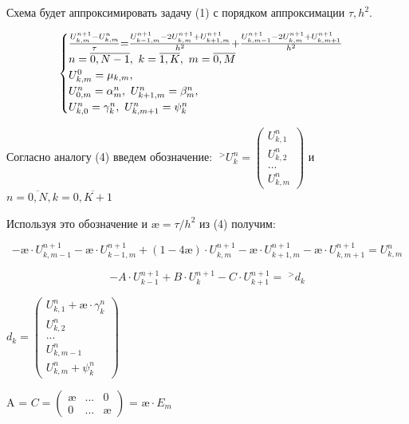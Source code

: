 \documentclass[__main__.tex]{subfiles}
\begin{document}
Схема будет аппроксимировать задачу (1) с порядком аппроксимации $ \tau, h^2 $.

\begin{equation} \label{50.4}
\begin{cases}
$$\frac{U^{n+1}_{k,m} - U^{n}_{k,m}}{\tau}$$ = $$\frac{U^{n+1}_{k-1,m} - 2U^{n+1}_{k,m} + U^{n+1}_{k+1,m}}{h^2}$$ + $$\frac{U^{n+1}_{k,m-1} - 2U^{n+1}_{k,m} + U^{n+1}_{k,m+1}}{h^2}$$ \\
n = \overline{0,N-1}, \ k = \overline{1,K}, \ m = \overline{0,M} \\
U^0_{k,m} = \mu_{k,m}, \\ 
U^n_{0,m} = \alpha^n_{m}, \ U^n_{k+1,m} = \beta^n_{m}, \\
U^n_{k,0} = \gamma^n_{k}, \ U^n_{k,m+1} = \psi^n_{k}
\end{cases}
\end{equation}

Согласно аналогу (4) введем обозначение: $\;^{>}U^n_k = \left(
\begin{matrix}
U^n_{k,1}  \\
U^n_{k,2}   \\
...  \\
U^n_{k,m}  
\end{matrix}
\right)$ и $n = \overline{0,N}, k = \overline{0,K+1}$

Используя это обозначение и $\text{\ae} = \tau/h^2$ из (4) получим:

\begin{equation}\label{50.5}
-\text{\ae} \cdot U^{n+1}_{k,m-1} - \text{\ae} \cdot U^{n+1}_{k-1,m} + (1 - 4\text{\ae}) \cdot U^{n+1}_{k,m} - \text{\ae} \cdot U^{n+1}_{k+1,m} - \text{\ae} \cdot U^{n+1}_{k,m+1} = U^{n}_{k,m}
\end{equation}

\begin{equation}\label{50.6}
-A \cdot U^{n+1}_{k-1} + B \cdot U^{n+1}_{k} - C \cdot U^{n+1}_{k+1} = \;^{>}d_k
\end{equation}

$d_k = \left(
\begin{matrix}
U^n_{k,1} + \text{\ae} \cdot \gamma^n_{k} \\
U^n_{k,2}   \\
...  \\
U^n_{k,m-1} \\
U^n_{k,m} + \psi^n_{k} 
\end{matrix}
\right)$

A = $C = \left(
\begin{matrix}
\text{\ae} & ... & 0 \\
0 &... & \text{\ae}
\end{matrix}
\right)$ = $\text{\ae} \cdot E_m$
\end{document}
